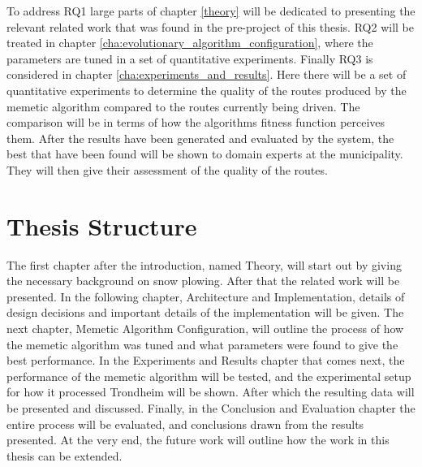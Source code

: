 To address RQ1 large parts of chapter \ref{theory} will be dedicated to presenting the relevant related work that was found in the pre-project of this thesis. RQ2 will be treated in chapter \ref{cha:evolutionary_algorithm_configuration}, where the parameters are tuned in a set of quantitative experiments. Finally RQ3 is considered in chapter \ref{cha:experiments_and_results}. Here there will be a set of quantitative experiments to determine the quality of the routes produced by the memetic algorithm compared to the routes currently being driven. The comparison will be in terms of how the algorithms fitness function perceives them. After the results have been generated and evaluated by the system, the best that have been found will be shown to domain experts at the municipality. They will then give their assessment of the quality of the routes.

\section{Thesis Structure}

The first chapter after the introduction, named Theory, will start out by giving the necessary background on snow plowing. After that the related work will be presented. In the following chapter, Architecture and Implementation, details of design decisions and important details of the implementation will be given. The next chapter, Memetic Algorithm Configuration, will outline the process of how the memetic algorithm was tuned and what parameters were found to give the best performance. In the Experiments and Results chapter that comes next, the performance of the memetic algorithm will be tested, and the experimental setup for how it processed Trondheim will be shown. After which the resulting data will be presented and discussed. Finally, in the Conclusion and Evaluation chapter the entire process will be evaluated, and conclusions drawn from the results presented. At the very end, the future work will outline how the work in this thesis can be extended.

\cleardoublepage

